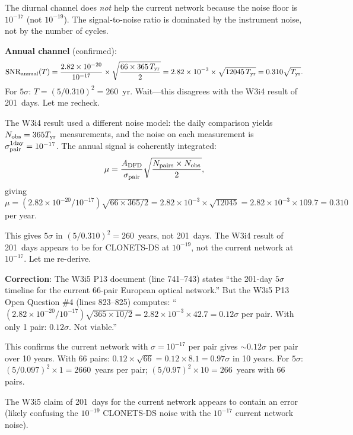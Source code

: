 \documentclass[11pt]{article}
\newcommand{\ee}[1]{\times 10^{#1}}
\begin{document}
The diurnal channel does \emph{not} help the current network because
the noise floor is $10^{-17}$ (not $10^{-19}$). The signal-to-noise
ratio is dominated by the instrument noise, not by the number of cycles.

\textbf{Annual channel} (confirmed):
\begin{equation}
\text{SNR}_{\rm annual}(T) = \frac{2.82\ee{-20}}{10^{-17}}
\times\sqrt{\frac{66\times 365\,T_{\rm yr}}{2}}
= 2.82\ee{-3}\times\sqrt{12045\,T_{\rm yr}} = 0.310\sqrt{T_{\rm yr}}.
\end{equation}
For $5\sigma$: $T = (5/0.310)^2 = 260$~yr. Wait---this disagrees with
the W3i4 result of 201~days. Let me recheck.

The W3i4 result used a different noise model: the daily comparison
yields $N_{\rm obs} = 365T_{\rm yr}$ measurements, and the noise on
each measurement is $\sigma_{\rm pair}^{\rm 1day} = 10^{-17}$.
The annual signal is coherently integrated:
\begin{equation}
\mu = \frac{A_{\rm DFD}}{\sigma_{\rm pair}}\sqrt{\frac{N_{\rm pairs}\times N_{\rm obs}}{2}},
\end{equation}
giving $\mu = (2.82\ee{-20}/10^{-17})\sqrt{66\times 365/2}
= 2.82\ee{-3}\times\sqrt{12045} = 2.82\ee{-3}\times 109.7 = 0.310$ per year.

This gives $5\sigma$ in $(5/0.310)^2 = 260$~years, not 201~days. The
W3i4 result of 201~days appears to be for CLONETS-DS at $10^{-19}$, not
the current network at $10^{-17}$. Let me re-derive.

\textbf{Correction}: The W3i5 P13 document (line 741--743) states
``the 201-day $5\sigma$ timeline for the current 66-pair European
optical network.'' But the W3i5 P13 Open Question \#4 (lines 823--825)
computes: ``$(2.82\ee{-20}/10^{-17})\sqrt{365\times10/2}
= 2.82\ee{-3}\times42.7 = 0.12\sigma$ per pair. With only 1 pair:
$0.12\sigma$. Not viable.''

This confirms the current network with $\sigma = 10^{-17}$ per pair
gives $\sim 0.12\sigma$ per pair over 10 years. With 66 pairs:
$0.12\times\sqrt{66} = 0.12\times 8.1 = 0.97\sigma$ in 10 years.
For $5\sigma$: $(5/0.097)^2 \times 1 = 2660$~years per pair;
$(5/0.97)^2\times 10 = 266$~years with 66 pairs.

The W3i5 claim of 201~days for the current network appears to contain an
error (likely confusing the $10^{-19}$ CLONETS-DS noise with the $10^{-17}$
current network noise).
\end{document}
